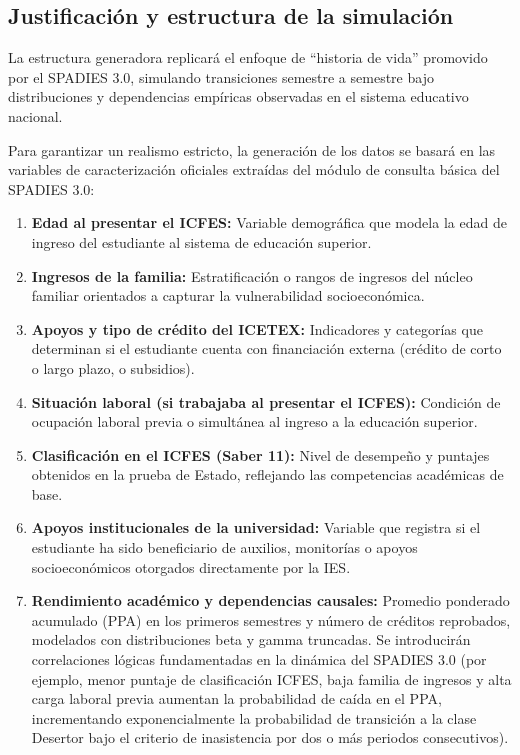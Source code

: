 \documentclass[12pt,a4paper]{article}
\begin{document}
\subsection{Justificación y estructura de la simulación}
La estructura generadora replicará el enfoque de ``historia de vida'' promovido por el SPADIES 3.0, simulando transiciones semestre a semestre bajo distribuciones y dependencias empíricas observadas en el sistema educativo nacional.

Para garantizar un realismo estricto, la generación de los datos se basará en las variables de caracterización oficiales extraídas del módulo de consulta básica del SPADIES 3.0:
\begin{enumerate}
    \item \textbf{Edad al presentar el ICFES:} Variable demográfica que modela la edad de ingreso del estudiante al sistema de educación superior.
    \item \textbf{Ingresos de la familia:} Estratificación o rangos de ingresos del núcleo familiar orientados a capturar la vulnerabilidad socioeconómica.
    \item \textbf{Apoyos y tipo de crédito del ICETEX:} Indicadores y categorías que determinan si el estudiante cuenta con financiación externa (crédito de corto o largo plazo, o subsidios).
    \item \textbf{Situación laboral (si trabajaba al presentar el ICFES):} Condición de ocupación laboral previa o simultánea al ingreso a la educación superior.
    \item \textbf{Clasificación en el ICFES (Saber 11):} Nivel de desempeño y puntajes obtenidos en la prueba de Estado, reflejando las competencias académicas de base.
    \item \textbf{Apoyos institucionales de la universidad:} Variable que registra si el estudiante ha sido beneficiario de auxilios, monitorías o apoyos socioeconómicos otorgados directamente por la IES.
    \item \textbf{Rendimiento académico y dependencias causales:} Promedio ponderado acumulado (PPA) en los primeros semestres y número de créditos reprobados, modelados con distribuciones beta y gamma truncadas. Se introducirán correlaciones lógicas fundamentadas en la dinámica del SPADIES 3.0 (por ejemplo, menor puntaje de clasificación ICFES, baja familia de ingresos y alta carga laboral previa aumentan la probabilidad de caída en el PPA, incrementando exponencialmente la probabilidad de transición a la clase Desertor bajo el criterio de inasistencia por dos o más periodos consecutivos).
\end{enumerate}
\end{document}
